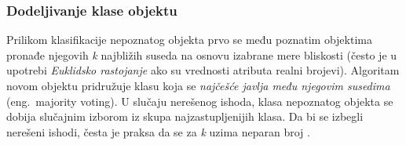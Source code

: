 \documentclass[12pt,oneside]{memoir}
\begin{document}

\subsubsection{Dodeljivanje klase objektu}
Prilikom klasifikacije nepoznatog objekta prvo se među poznatim objektima pronađe njegovih \textit{k} najbližih suseda na osnovu izabrane mere bliskosti (često je u upotrebi \textit{Euklidsko rastojanje} ako su vrednosti atributa realni brojevi). %
Algoritam novom objektu pridružuje klasu koja se \textit{najčešće javlja među njegovim susedima} (eng.~majority voting). U slučaju nerešenog ishoda, klasa nepoznatog objekta se dobija slučajnim izborom iz skupa najzastupljenijih klasa. Da bi se izbegli nerešeni ishodi, česta je praksa da se za \textit{k} uzima neparan broj \cite{mitic, mladen, mlm}.%
\par
\end{document}

